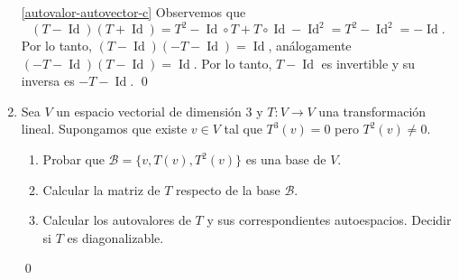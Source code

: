 \begin{enumerate}[topsep=6pt, itemsep=.4cm]
\ref{autovalor-autovector-c} Observemos que 
$$
(T- \operatorname{Id})(T+\operatorname{Id}) = T^2 - \operatorname{Id} \circ T + T \circ \operatorname{Id} - \operatorname{Id}^2  = T^2 - \operatorname{Id}^2 = - \operatorname{Id}.
$$
Por lo tanto, $(T- \operatorname{Id})(-T-\operatorname{Id}) = \operatorname{Id}$, análogamente $(-T-\operatorname{Id})(T- \operatorname{Id}) = \operatorname{Id}$. Por lo tanto, $T- \operatorname{Id}$ es invertible y su inversa es $-T-\operatorname{Id}$.
\qed


\item\label{base nilp}  Sea $V$ un espacio vectorial de dimensión $3$ y $T:V\longrightarrow V$ una transformación lineal. Supongamos que existe $v\in V$ tal que $T^3(v)=0$ pero $T^2(v)\neq0$.
\begin{enumerate}
    \item\label{base nilp a}  Probar que $\mathcal{B}=\{v,T(v),T^2(v)\}$ es una base de $V$.
    \item\label{base nilp b} Calcular la matriz de $T$ respecto de la base $\mathcal{B}$.
    \item\label{base nilp c} Calcular los autovalores de $T$ y sus correspondientes autoespacios. Decidir si $T$ es diagonalizable.
\end{enumerate}

\rta


\qed




\end{enumerate}


